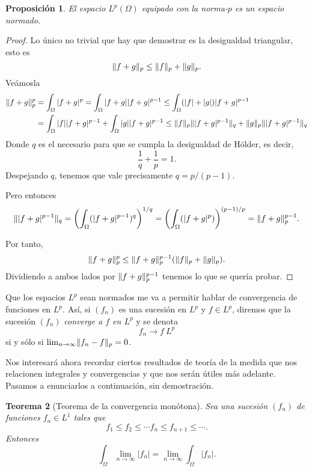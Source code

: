 \documentclass[12pt,a4paper]{book}
\DeclarePairedDelimiter\norm{\lVert}{\rVert}
\newtheorem{thm}{Teorema}[section]
\newtheorem{prop}[thm]{Proposición}
\theoremstyle{definition} \newtheorem{defn}[thm]{Definición}
\theoremstyle{definition} \newtheorem{ejemplo}[thm]{Ejemplo}
\theoremstyle{definition} \newtheorem{ejercicio}[thm]{Ejercicio}
\theoremstyle{remark} \newtheorem*{obs}{Observación}
\begin{document}
\begin{prop}
  El espacio $L^p(\Omega)$ equipado con la norma-$p$ es un espacio normado.
\end{prop}
\begin{proof}
  Lo único no trivial que hay que demostrar es la desigualdad triangular, esto es
  \begin{equation*}
    \norm{f+g}_p \leq \norm{f}_p + \norm{g}_p.
  \end{equation*}
  Veámosla
  \begin{align*}
    \norm{f+g}_p^p &= \int_\Omega |f+g|^p = \int_\Omega |f+g||f+g|^{p-1} \leq \int_\Omega (|f|+|g|) |f+g|^{p-1} \\ & = \int_\Omega |f| |f+g|^{p-1} + \int_\Omega |g| |f+g|^{p-1} \leq \norm{f}_p \norm{|f+g|^{p-1}}_q +\norm{g}_p \norm{|f+g|^{p-1}}_q
  \end{align*}
  Donde $q$ es el necesario para que se cumpla la desigualdad de Hölder, es decir, 
  \begin{equation*}
    \frac{1}{q}+\frac{1}{p}=1.
  \end{equation*}
  Despejando $q$, tenemos que vale precisamente $q=p/(p-1)$.

  Pero entonces
  \begin{equation*}
    \norm{|f+g|^{p-1}}_q=\left( \int_\Omega (|f+g|^{p-1})^q \right)^{1/q}=\left( \int_\Omega (|f+g|^p) \right)^{(p-1)/p}=\norm{f+g}_p^{p-1}.
  \end{equation*}
  
  Por tanto,
  \begin{equation*}
    \norm{f+g}_p^p \leq \norm{f+g}_p^{p-1}(\norm{f}_p + \norm{g}_p).
  \end{equation*}
  Dividiendo a ambos lados por $\norm{f+g}_p^{p-1}$ tenemos lo que se quería probar.
\end{proof}

Que los espacios $L^p$ sean normados me va a permitir hablar de convergencia de funciones en $L^p$. Así, si $(f_n)$ es una sucesión en $L^p$ y $f\in L^p$, diremos que la sucesión $(f_n)$ \emph{converge a $f$ en $L^p$} y se denota
\begin{equation*}
  f_n \rightarrow f \ L^p
\end{equation*}
si y sólo si $\lim_{n\rightarrow \infty} \norm{f_n-f}_p=0$.

Nos interesará ahora recordar ciertos resultados de teoría de la medida que nos relacionen integrales y convergencias y que nos serán útiles más adelante. Pasamos a enunciarlos a continuación, sin demostración.
\begin{thm}[Teorema de la convergencia monótona]
  Sea una sucesión $(f_n)$ de funciones $f_n \in L^1$ tales que
  \begin{equation*}
    f_1 \leq f_2 \leq \cdots f_n \leq f_{n+1} \leq \cdots.
  \end{equation*}
  Entonces 
  \begin{equation*}
    \int_\Omega \lim_{n\rightarrow \infty } |f_n| = \lim_{n\rightarrow \infty} \int_\Omega |f_n|.
  \end{equation*}
\end{thm}
\end{document}
